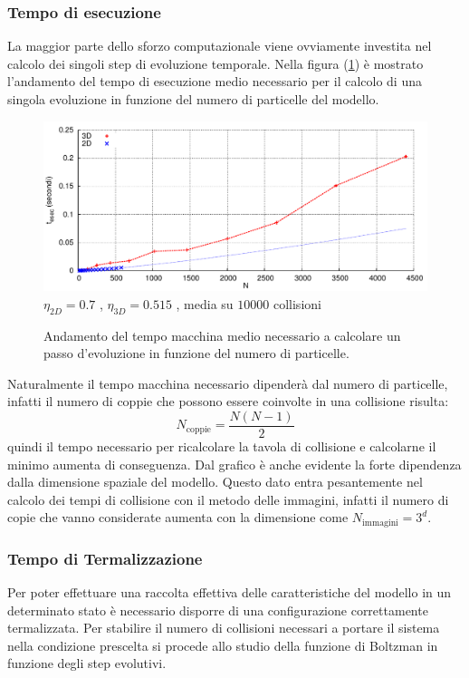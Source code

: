 \documentclass[11pt]{article}
\theoremstyle{plain}
\theoremstyle{remark}
\begin{document}
\subsubsection{Tempo di esecuzione}
La maggior parte dello sforzo computazionale viene ovviamente investita nel calcolo dei singoli step di evoluzione temporale.
Nella figura (\ref{fig: TempoEsecuzione}) è mostrato l'andamento del tempo di esecuzione medio necessario per il calcolo di una singola evoluzione in funzione del numero di particelle del modello.
\begin{figure}[htbp]
	\centering
\caption[Sfere Rigide$/$Preliminari\_TempoEsecuzione.cpp]{Andamento del tempo macchina medio necessario a calcolare un passo d'evoluzione in funzione del numero di particelle.}\vspace{-15pt}
	\includegraphics[scale=0.95]{Immagini/Rigide/T_esec}
	\newline \footnotesize{$\eta_{2D}= 0.7$ , $\eta_{3D}= 0.515$ , media su $10000$ collisioni}
	\label{fig: TempoEsecuzione}
\end{figure}
Naturalmente il tempo macchina necessario dipenderà dal numero di particelle, infatti il numero di coppie che possono essere coinvolte in una collisione risulta:
\begin{displaymath}
N_\textrm{coppie} = \dfrac{N (N-1)}{2}
\end{displaymath}
quindi il tempo necessario per ricalcolare la tavola di collisione e calcolarne il minimo aumenta di conseguenza.
\newline
Dal grafico è anche evidente la forte dipendenza dalla dimensione spaziale del modello. Questo dato entra pesantemente nel calcolo dei tempi di collisione con il metodo delle immagini, infatti il numero di copie che vanno considerate aumenta con la dimensione come $ N_\textrm{immagini} = 3^d $.


\subsubsection{Tempo di Termalizzazione}
Per poter effettuare una raccolta effettiva delle caratteristiche del modello in un determinato stato è necessario disporre di una configurazione correttamente termalizzata.
Per stabilire il numero di collisioni necessari a portare il sistema nella condizione prescelta si procede allo studio della funzione di Boltzman in funzione degli step evolutivi.
\end{document}
